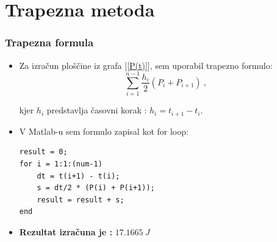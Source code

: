 \documentclass[10pt]{beamer}
\begin{document}
\section{Trapezna metoda}
\begin{frame}[fragile]
\frametitle{Trapezna formula}
\begin{itemize}
   
\item Za izračun ploščine iz grafa [\ref{P(t)}], sem uporabil trapezno formulo:
$$\sum_{i=1}^{n-1} \frac{h_i}{2} (P_i + P_{i+1})\ ,$$

kjer $h_i$ predstavlja časovni korak : $h_i = t_{i+1} - t_i$. 

\item V Matlab-u sem formulo zapisal kot for loop:
\begin{verbatim}
result = 0;
for i = 1:1:(num-1)
    dt = t(i+1) - t(i); 
    s = dt/2 * (P(i) + P(i+1));
    result = result + s;
end
\end{verbatim}
\item \textbf{Rezultat izračuna je :} $17.1665\ J$
\end{itemize}
\end{frame}
\end{document}
